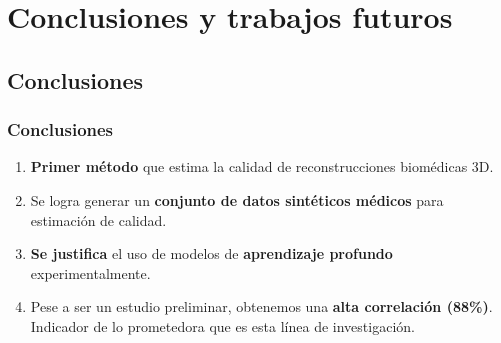 \section{Conclusiones y trabajos futuros}
\subsection{Conclusiones}

\begin{frame}
  \frametitle{Conclusiones}
  \begin{enumerate}[<+->]
    \item \textbf{Primer método} que estima la calidad de reconstrucciones biomédicas 3D.
    \item Se logra generar un \textbf{conjunto de datos sintéticos médicos} para estimación de calidad.
    \item \textbf{Se justifica} el uso de modelos de \textbf{aprendizaje profundo} \alert{experimentalmente}.
    \item Pese a ser un estudio preliminar, obtenemos una \textbf{alta correlación (88\%)}. Indicador 
      de lo prometedora que es esta línea de investigación.
  \end{enumerate}
\end{frame}

